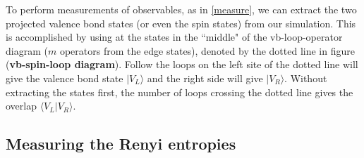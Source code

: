 \documentclass[prb,aps,twocolumn,floatfix,amsmath,amssymb,superscriptaddress,tightenlines]{revtex4}
\begin{document}
To perform measurements of observables, as in \eqref{measure}, we can extract the two projected valence bond states (or even the spin states) from our simulation.  
This  is accomplished by using at the states in the ``middle" of the vb-loop-operator diagram ($m$ operators from the edge states), denoted by the dotted line in figure ({\bf \!vb-spin-loop diagram}).
Follow the loops on the left site of the dotted line will give the valence bond state $\lvert V_L \rangle$ and the right side will give $\lvert V_R \rangle$.
Without extracting the states first, the number of loops crossing the dotted line gives the overlap $\langle V_L \lvert V_R \rangle $.

\subsection{Measuring the Renyi entropies}
\end{document}
